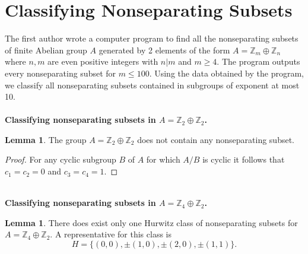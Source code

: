 \documentclass[article,dvisp]{amsart}
\def\Z{\mathbb{Z}}
\theoremstyle{definition}
\newtheorem{lem}[thm]{Lemma}
\theoremstyle{remark}
\numberwithin{equation}{section}
\theoremstyle{lemma}
\begin{document}
\section{Classifying Nonseparating Subsets}
The first author wrote a computer program to find all the nonseparating subsets of finite Abelian group $A$ generated by 2 elements of the form $A=\Z_{m}\oplus \Z_{n}$ where $n, m$ are even positive integers with $n|m$ and $m\geq4$. The program outputs every nonseparating subset for $m\leq 100$. Using the data obtained by the program, we classify all nonseparating subsets contained in subgroups of exponent at most 10.\\
\\
\textbf{Classifying nonseparating subsets in $A=\Z_{2}\oplus\Z_{2}$.}
\begin{lem}\label{lem:100} The group $A=\Z_{2}\oplus \Z_{2}$ does not contain any nonseparating subset.
\end{lem} 
\begin{proof} For any cyclic subgroup $B$ of $A$ for which $A/B$ is cyclic it follows that $c_{1}=c_{2}=0$ and $c_{3}=c_{4}=1$.
\end{proof}\
\\
\textbf{Classifying nonseparating subsets in $A=\Z_{4}\oplus \Z_{2}$.}
\begin{lem}\label{lem:101} There does exist only one Hurwitz class of nonseparating subsets for $A=\Z_{4}\oplus \Z_{2}$. A representative for this class is $$H=\{(0,0), \pm(1,0), \pm(2,0), \pm(1,1)\}.$$\end{lem}
\end{document}
